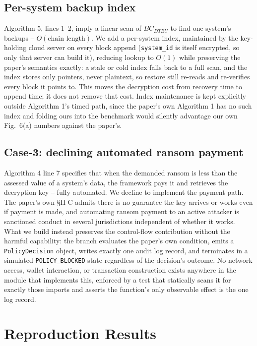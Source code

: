 \documentclass[conference]{IEEEtran}
\begin{document}
\subsection{Per-system backup index}

Algorithm 5, lines 1--2, imply a linear scan of $BC_{DTBU}$ to find one system's backups --
$O(\text{chain length})$. We add a per-system index, maintained by the key-holding cloud server
on every block append (\texttt{system\_id} is itself encrypted, so only that server can build
it), reducing lookup to $O(1)$ while preserving the paper's semantics exactly: a stale or cold
index falls back to a full scan, and the index stores only pointers, never plaintext, so restore
still re-reads and re-verifies every block it points to. This moves the decryption cost from
recovery time to append time; it does not remove that cost. Index maintenance is kept explicitly
outside Algorithm 1's timed path, since the paper's own Algorithm 1 has no such index and
folding ours into the benchmark would silently advantage our own Fig.~6(a) numbers against the
paper's.

\subsection{Case-3: declining automated ransom payment}

Algorithm 4 line 7 specifies that when the demanded ransom is less than the assessed value of a
system's data, the framework pays it and retrieves the decryption key -- fully automated. We
decline to implement the payment path. The paper's own \S II-C admits there is no guarantee the
key arrives or works even if payment is made, and automating ransom payment to an active
attacker is sanctioned conduct in several jurisdictions independent of whether it works. What we
build instead preserves the control-flow contribution without the harmful capability: the branch
evaluates the paper's own condition, emits a \texttt{PolicyDecision} object, writes exactly one
audit log record, and terminates in a simulated \texttt{POLICY\_BLOCKED} state regardless of the
decision's outcome. No network access, wallet interaction, or transaction construction exists
anywhere in the module that implements this, enforced by a test that statically scans it for
exactly those imports and asserts the function's only observable effect is the one log record.
\section{Reproduction Results}
\label{sec:repro}
\end{document}
